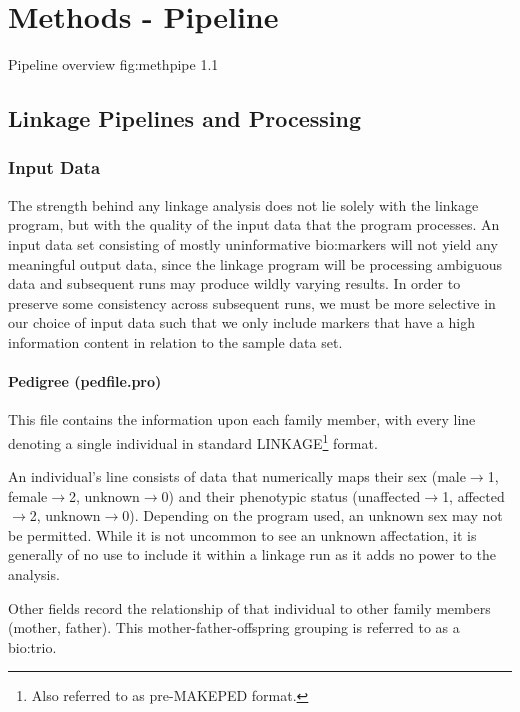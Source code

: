 \chapter{Methods - Pipeline}

{Pipeline overview}
{fig:methpipe}
{1.1}{}

\section{Linkage Pipelines and Processing}



\subsection{Input Data}

The strength behind any linkage analysis does not lie solely with the linkage program, but with the quality of the input data that the program processes. An input data set consisting of mostly uninformative \gls{bio:markers} will not yield any meaningful output data, since the linkage program will be processing ambiguous data and subsequent runs may produce wildly varying results. In order to preserve some consistency across subsequent runs, we must be more selective in our choice of input data such that we only include markers that have a high information content in relation to the sample data set.

\subsubsection{Pedigree (pedfile.pro)}

This file contains the information upon each family member, with every line denoting a single individual in standard LINKAGE\footnote{Also referred to as pre-MAKEPED format.} format.

An individual's line consists of data that numerically maps their sex ({male\(\rightarrow\)1, female\(\rightarrow\)2, unknown\(\rightarrow\)0}) and their phenotypic status ({unaffected\(\rightarrow\)1, affected\(\rightarrow\)2, unknown\(\rightarrow\)0}). Depending on the program used, an unknown sex may not be permitted. While it is not uncommon to see an unknown affectation, it is generally of no use to include it within a linkage run as it adds no power to the analysis.

Other fields record the relationship of that individual to other family members (mother, father). This mother-father-offspring grouping is referred to as a \gls{bio:trio}.

